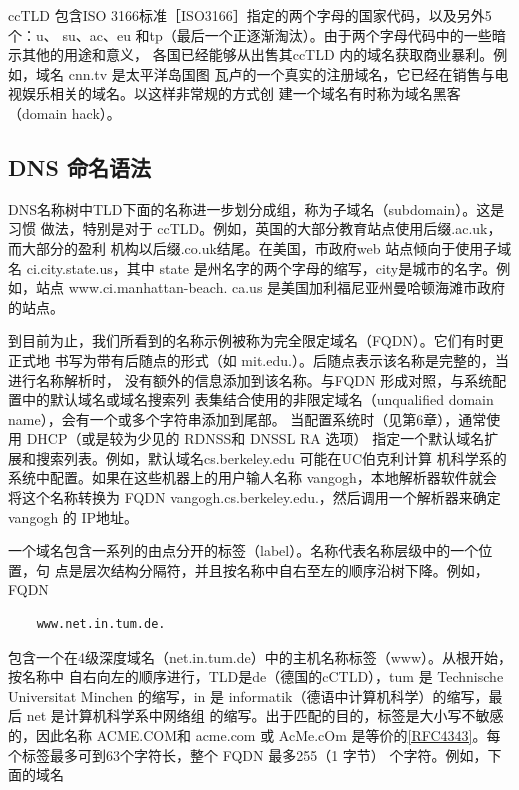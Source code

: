 
ccTLD 包含ISO 3166标准［ISO3166］指定的两个字母的国家代码，以及另外5个：u、
su、ac、eu 和tp（最后一个正逐渐淘汰）。由于两个字母代码中的一些暗示其他的用途和意义，
各国已经能够从出售其ccTLD 内的域名获取商业暴利。例如，域名 cnn.tv 是太平洋岛国图
瓦卢的一个真实的注册域名，它已经在销售与电视娱乐相关的域名。以这样非常规的方式创
建一个域名有时称为域名黑客（domain hack）。

\subsection{DNS 命名语法}

DNS名称树中TLD下面的名称进一步划分成组，称为子域名（subdomain）。这是习惯
做法，特别是对于 ccTLD。例如，英国的大部分教育站点使用后缀.ac.uk，而大部分的盈利
机构以后缀.co.uk结尾。在美国，市政府web 站点倾向于使用子域名 ci.city.state.us，其中
state 是州名字的两个字母的缩写，city是城市的名字。例如，站点 www.ci.manhattan-beach.
ca.us 是美国加利福尼亚州曼哈顿海滩市政府的站点。

到目前为止，我们所看到的名称示例被称为完全限定域名（FQDN）。它们有时更正式地
书写为带有后随点的形式（如 mit.edu.）。后随点表示该名称是完整的，当进行名称解析时，
没有额外的信息添加到该名称。与FQDN 形成对照，与系统配置中的默认域名或域名搜索列
表集结合使用的非限定域名（unqualified domain name），会有一个或多个字符串添加到尾部。
当配置系统时（见第6章），通常使用 DHCP（或是较为少见的 RDNSS和 DNSSL RA 选项）
指定一个默认域名扩展和搜索列表。例如，默认域名cs.berkeley.edu 可能在UC伯克利计算
机科学系的系统中配置。如果在这些机器上的用户输人名称 vangogh，本地解析器软件就会
将这个名称转换为 FQDN vangogh.cs.berkeley.edu.，然后调用一个解析器来确定 vangogh 的
IP地址。

一个域名包含一系列的由点分开的标签（label）。名称代表名称层级中的一个位置，句
点是层次结构分隔符，并且按名称中自右至左的顺序沿树下降。例如，FQDN

\begin{verbatim}
    www.net.in.tum.de.
\end{verbatim}

包含一个在4级深度域名（net.in.tum.de）中的主机名称标签（www）。从根开始，按名称中
自右向左的顺序进行，TLD是de（德国的cCTLD），tum 是 Technische Universitat Minchen
的缩写，in 是 informatik（德语中计算机科学）的缩写，最后 net 是计算机科学系中网络组
的缩写。出于匹配的目的，标签是大小写不敏感的，因此名称 ACME.COM和 acme.com 或
AcMe.cOm
是等价的\href{https://www.rfc-editor.org/rfc/rfc4343}{[RFC4343]}。每个标签最多可到63个字符长，整个
FQDN 最多255（1
字节） 个字符。例如，下面的域名

